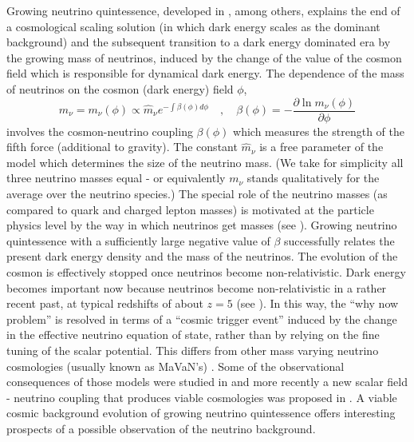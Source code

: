 Growing neutrino quintessence, developed in \cite{amendola_growing_2008,wetterich_growing_2007}, among others,
explains the end of a cosmological scaling solution (in which dark
energy scales as the dominant background) and the subsequent transition
to a dark energy dominated era by the growing mass of neutrinos, induced
by the change of the value of the cosmon field which is responsible
for dynamical dark energy. 
The dependence of the mass of neutrinos
on the cosmon (dark energy) field $\phi$, 
\begin{equation}
m_{\nu}=m_{\nu}(\phi)\propto\hat{m}_{\nu}e^{-\int\beta(\phi)d\phi}\quad,\quad \beta(\phi)=-\frac{\partial\ln m_{\nu}(\phi)}{\partial\phi}\label{eq: mass_def}
\end{equation}
involves the cosmon-neutrino coupling $\beta(\phi)$ which measures
the strength of the fifth force (additional to gravity). The constant
$\hat{m}_{\nu}$ is a free parameter of the model which determines
the size of the neutrino mass. (We take for simplicity all three neutrino
masses equal - or equivalently $m_{\nu}$ stands qualitatively for
the average over the neutrino species.) The special role of the neutrino
masses (as compared to quark and charged lepton masses) is motivated
at the particle physics level by the way in which neutrinos get masses
(see \cite{wetterich_growing_2007}). Growing neutrino quintessence with
a sufficiently large negative value of $\beta$ successfully relates
the present dark energy density and the mass of the neutrinos. The
evolution of the cosmon is effectively stopped once neutrinos become
non-relativistic. Dark energy becomes important now because neutrinos
become non-relativistic in a rather recent past, at typical redshifts
of about $z=5$ (see \cite{mota_neutrino_2008}). In this way, the ``why
now problem'' is resolved in terms of a ``cosmic trigger event''
induced by the change in the effective neutrino equation of state,
rather than by relying on the fine tuning of the scalar potential.
This differs from other mass varying neutrino cosmologies (usually
known as MaVaN's) \cite{brookfield_cosmology_2007,la_vacca_mass-varying_2013,bi_cosmological_2005,fardon_dark_2004,kaplan_neutrino_2004,spitzer_stability_2006,takahashi_speed_2006}.
Some of the observational consequences of those models were studied
in \cite{la_vacca_mass-varying_2013,kaplan_neutrino_2004} and more
recently a new scalar field - neutrino coupling that produces viable
cosmologies was proposed in \cite{simpson_dark_2016}. A viable cosmic
background evolution of growing neutrino quintessence offers interesting
prospects of a possible observation of the neutrino background.

